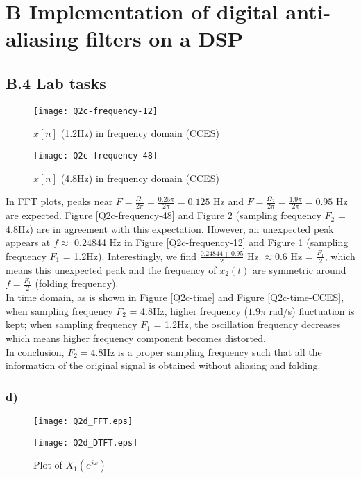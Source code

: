 \documentclass{article}
\newenvironment{homeworkProblem}[1]{
	\section*{#1}
	}{
}
\newenvironment{homeworkSection}[1]{
	\subsection*{#1}
	}{
}
\begin{document}
\begin{homeworkProblem}{B Implementation of digital anti-aliasing filters on a DSP}
\begin{homeworkSection}{B.4 Lab tasks}
\begin{figure}[H]
\centering
\texttt{[image: Q2c-frequency-12]}
\caption{$x[n]$ (1.2Hz) in frequency domain (CCES)}
\label{Q2c-frequency-12-CCES}
\end{figure}

\begin{figure}[H]
\centering
\texttt{[image: Q2c-frequency-48]}
\caption{$x[n]$ (4.8Hz) in frequency domain (CCES)}
\label{Q2c-frequency-48-CCES}
\end{figure}

In FFT plots, peaks near $F = \frac{\Omega_1}{2\pi} = \frac{0.25\pi}{2\pi} = 0.125$ Hz and $F = \frac{\Omega_2}{2\pi} = \frac{1.9\pi}{2\pi} = 0.95$ Hz are expected.
Figure \ref{Q2c-frequency-48} and Figure \ref{Q2c-frequency-48-CCES} (sampling frequency $F_2$ = 4.8Hz) are in agreement with this expectation.
However, an unexpected peak appears at $f \approx$ 0.24844 Hz in Figure \ref{Q2c-frequency-12} and Figure \ref{Q2c-frequency-12-CCES} (sampling frequency $F_1$ = 1.2Hz). Interestingly, we find $\frac{0.24844 + 0.95}{2}$ Hz $\approx 0.6$ Hz = $\frac{F_1}{2}$, which means this unexpected peak and the frequency of $x_2(t)$ are symmetric around $f = \frac{F_1}{2}$ (folding frequency).\\

In time domain, as is shown in Figure \ref{Q2c-time} and Figure \ref{Q2c-time-CCES}, when sampling frequency $F_2$ = 4.8Hz, higher frequency ($1.9\pi$ rad/s) fluctuation is kept; when sampling frequency $F_1$ = 1.2Hz, the oscillation frequency decreases which means higher frequency component becomes distorted.\\

In conclusion, $F_2=4.8\text{Hz}$ is a proper sampling frequency such that all the information of the original signal is obtained without aliasing and folding.


\subsubsection*{d)}

\begin{figure}[H]
\begin{minipage}[t]{0.5\linewidth}
\centering
\texttt{[image: Q2d\_FFT.eps]}
\caption{Plot of $X_1(F)$}
\label{Q2d_FFT}
\end{minipage}
\begin{minipage}[t]{0.5\linewidth}
\centering
\texttt{[image: Q2d\_DTFT.eps]}
\caption{Plot of $X_1(e^{j\omega})$}
\label{Q2d_DTFT}
\end{minipage}
\end{figure}


\end{homeworkSection}
\end{homeworkProblem}
\end{document}
